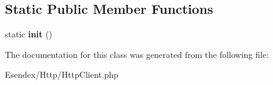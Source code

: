 \subsection*{Static Public Member Functions}
\begin{DoxyCompactItemize}
\item 
static {\bfseries init} ()\label{class_esendex_1_1_http_1_1_http_client_ab9e449b579970767cab61dd3330b745b}

\end{DoxyCompactItemize}


The documentation for this class was generated from the following file\-:\begin{DoxyCompactItemize}
\item 
Esendex/\-Http/Http\-Client.\-php\end{DoxyCompactItemize}
